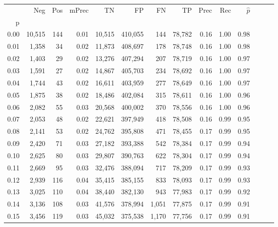 \begin{tabular}{rrrrrrrrrrrrrr}
\toprule
{} &     Neg &    Pos & mPrec &       TN &       FP &      FN &      TP &  Prec &   Rec & $\hat{p}$ \\
p    &         &        &       &          &          &         &         &       &       &           \\
\midrule
0.00 &  10,515 &    144 &  0.01 &   10,515 &  410,055 &     144 &  78,782 &  0.16 &  1.00 &      0.98 \\
0.01 &   1,358 &     34 &  0.02 &   11,873 &  408,697 &     178 &  78,748 &  0.16 &  1.00 &      0.98 \\
0.02 &   1,403 &     29 &  0.02 &   13,276 &  407,294 &     207 &  78,719 &  0.16 &  1.00 &      0.97 \\
0.03 &   1,591 &     27 &  0.02 &   14,867 &  405,703 &     234 &  78,692 &  0.16 &  1.00 &      0.97 \\
0.04 &   1,744 &     43 &  0.02 &   16,611 &  403,959 &     277 &  78,649 &  0.16 &  1.00 &      0.97 \\
0.05 &   1,875 &     38 &  0.02 &   18,486 &  402,084 &     315 &  78,611 &  0.16 &  1.00 &      0.96 \\
0.06 &   2,082 &     55 &  0.03 &   20,568 &  400,002 &     370 &  78,556 &  0.16 &  1.00 &      0.96 \\
0.07 &   2,053 &     48 &  0.02 &   22,621 &  397,949 &     418 &  78,508 &  0.16 &  0.99 &      0.95 \\
0.08 &   2,141 &     53 &  0.02 &   24,762 &  395,808 &     471 &  78,455 &  0.17 &  0.99 &      0.95 \\
0.09 &   2,420 &     71 &  0.03 &   27,182 &  393,388 &     542 &  78,384 &  0.17 &  0.99 &      0.94 \\
0.10 &   2,625 &     80 &  0.03 &   29,807 &  390,763 &     622 &  78,304 &  0.17 &  0.99 &      0.94 \\
0.11 &   2,669 &     95 &  0.03 &   32,476 &  388,094 &     717 &  78,209 &  0.17 &  0.99 &      0.93 \\
0.12 &   2,939 &    116 &  0.04 &   35,415 &  385,155 &     833 &  78,093 &  0.17 &  0.99 &      0.93 \\
0.13 &   3,025 &    110 &  0.04 &   38,440 &  382,130 &     943 &  77,983 &  0.17 &  0.99 &      0.92 \\
0.14 &   3,136 &    108 &  0.03 &   41,576 &  378,994 &   1,051 &  77,875 &  0.17 &  0.99 &      0.91 \\
0.15 &   3,456 &    119 &  0.03 &   45,032 &  375,538 &   1,170 &  77,756 &  0.17 &  0.99 &      0.91 \\

\end{tabular}
